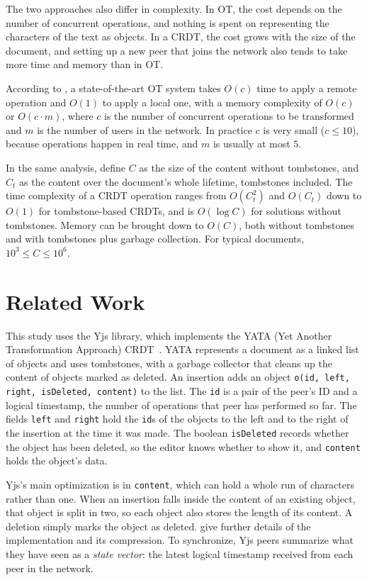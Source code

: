 The two approaches also differ in complexity. In OT, the cost depends on the number of concurrent operations, and nothing is spent on representing the characters of the text as objects. In a CRDT, the cost grows with the size of the document, and setting up a new peer that joins the network also tends to take more time and memory than in OT.

According to \citet{Sun2019Second}, a state-of-the-art OT system takes $O(c)$ time to apply a remote operation and $O(1)$ to apply a local one, with a memory complexity of $O(c)$ or $O(c \cdot m)$, where $c$ is the number of concurrent operations to be transformed and $m$ is the number of users in the network. In practice $c$ is very small ($c \leq 10$), because operations happen in real time, and $m$ is usually at most $5$.

In the same analysis, define $C$ as the size of the content without tombstones, and $C_t$ as the content over the document's whole lifetime, tombstones included. The time complexity of a CRDT operation ranges from $O(C_{t}^{2})$ and $O(C_{t})$ down to $O(1)$ for tombstone-based CRDTs, and is $O(\log C)$ for solutions without tombstones. Memory can be brought down to $O(C)$, both without tombstones and with tombstones plus garbage collection. For typical documents, $10^3 \leq C \leq 10^6$.

\section{Related Work}
\label{sec:penelitian_terkait}

This study uses the Yjs library, which implements the YATA (Yet Another Transformation Approach) CRDT~\citep{Nicolaescu2016yjs}. YATA represents a document as a linked list of objects and uses tombstones, with a garbage collector that cleans up the content of objects marked as deleted. An insertion adds an object \texttt{o(id, left, right, isDeleted, content)} to the list. The \texttt{id} is a pair of the peer's ID and a logical timestamp, the number of operations that peer has performed so far. The fields \texttt{left} and \texttt{right} hold the \texttt{id}s of the objects to the left and to the right of the insertion at the time it was made. The boolean \texttt{isDeleted} records whether the object has been deleted, so the editor knows whether to show it, and \texttt{content} holds the object's data.

Yjs's main optimization is in \texttt{content}, which can hold a whole run of characters rather than one. When an insertion falls inside the content of an existing object, that object is split in two, so each object also stores the length of its content. A deletion simply marks the object as deleted. \citet{Nicolaescu2016yjs} give further details of the implementation and its compression. To synchronize, Yjs peers summarize what they have seen as a \emph{state vector}: the latest logical timestamp received from each peer in the network.

